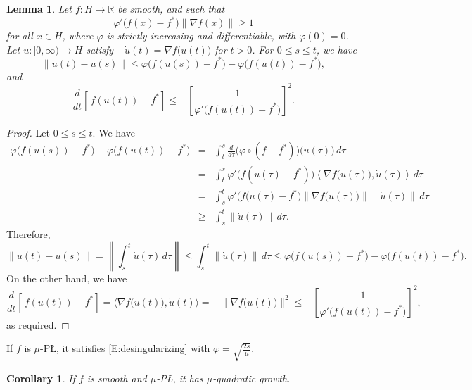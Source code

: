 \documentclass[pdflatex,sn-mathphys-num]{sn-jnl}
\theoremstyle{thmstyleone}
\newtheorem{lemma}[theorem]{Lemma}
\newtheorem{corollary}[theorem]{Corollary}
\theoremstyle{thmstyletwo}
\theoremstyle{thmstylethree}
\newcommand{\R}{\mathbb{R}}
\begin{document}
\begin{appendices}
\begin{lemma}
Let $f:H\to\R$ be smooth, and such that
\begin{equation} \label{E:desingularizing}
\varphi'\big(f(x)-f^*\big)\|\nabla f(x)\|\ge 1    
\end{equation}
for all $x\in H$, where $\varphi$ is strictly increasing and differentiable, with $\varphi(0)=0$. Let $u:[0,\infty)\to H$ satisfy $-\dot u(t)=\nabla f\big(u(t)\big)$ for $t>0$. For $0\le s\le t$, we have  
\begin{equation} \label{E:length}
\|u(t)-u(s)\|\le \varphi\big(f(u(s))-f^*\big)-\varphi\big(f(u(t))-f^*\big),  
\end{equation}
and
\begin{equation} \label{E:Loja_values}
\frac{d}{dt}\left[\frac{}{}\!f(u(t))-f^*\right]\le -\left[\frac{1}{\varphi'\big(f(u(t))-f^*\big)}\right]^2.   
\end{equation}
\end{lemma}


\begin{proof}
Let $0\le s\le t$. We have
\begin{eqnarray*}
\varphi\big(f(u(s))-f^*\big)-\varphi\big(f(u(t))-f^*\big) 
& = & \int_t^s\frac{d}{d\tau} \big(\varphi\circ(f-f^*)\big)\big(u(\tau)\big) \,d\tau \\
& = & \int_t^s\varphi'\big(f(u(\tau)-f^*)\big)\left\langle \nabla f\big(u(\tau)\big),\dot u(\tau)\right\rangle\,d\tau  \\
& = & \int_s^t\varphi'\big(f(u(\tau)-f^*\big)\left\|\nabla f\big(u(\tau)\big)\right\|\left\|\dot u(\tau)\right\|\,d\tau  \\
& \ge & \int_s^t\left\|\dot u(\tau)\right\|\,d\tau .
\end{eqnarray*}
Therefore,
$$\|u(t)-u(s)\|= \left\|\int_s^t\dot u(\tau)\,d\tau\right\|\le \int_s^t\left\|\dot u(\tau)\right\|\,d\tau\le \varphi\big(f(u(s))-f^*\big)-\varphi\big(f(u(t))-f^*\big).$$  
On the other hand, we have
$$\frac{d}{dt}\left[\frac{}{}\!f(u(t))-f^*\right]=\langle \nabla f\big(u(t)\big),\dot u(t)\rangle=-\|\nabla f\big(u(t)\big)\|^2\le -\left[\frac{1}{\varphi'\big(f(u(t))-f^*\big)}\right
]^2,$$
as required.
\end{proof}

If $f$ is $\mu$-P{\L}, it satisfies \eqref{E:desingularizing} with $\varphi=\sqrt{\frac{2s}{\mu}}$.

\begin{corollary} \label{C:PLtoQG}
If $f$ is smooth and $\mu$-P{\L}, it has $\mu$-quadratic growth.
\end{corollary}


\end{appendices}
\end{document}

